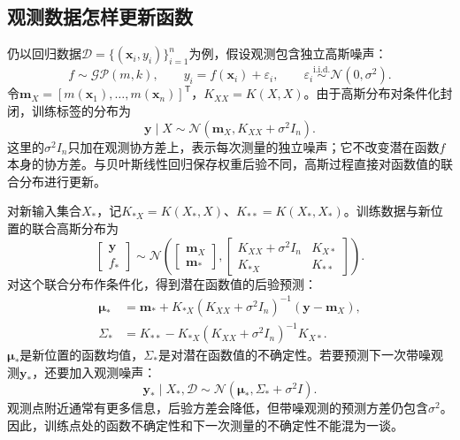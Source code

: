 \subsection{观测数据怎样更新函数}
仍以回归数据$\mathcal D=\{(\bm x_i,y_i)\}_{i=1}^n$为例，假设观测包含独立高斯噪声：
\begin{equation}
 f\sim\mathcal{GP}(m,k),
 \qquad y_i=f(\bm x_i)+\varepsilon_i,
 \qquad \varepsilon_i\overset{\mathrm{i.i.d.}}\sim\mathcal N(0,\sigma^2).
 \label{eq:gp-observation-model}
\end{equation}
令$\bm m_X=[m(\bm x_1),\ldots,m(\bm x_n)]^{\mathsf T}$，$K_{XX}=K(X,X)$。由于高斯分布对条件化封闭，训练标签的分布为
\begin{equation}
 \bm y\mid X\sim\mathcal N\left(\bm m_X,K_{XX}+\sigma^2I_n\right).
 \label{eq:gp-marginal-likelihood}
\end{equation}
这里的$\sigma^2I_n$只加在观测协方差上，表示每次测量的独立噪声；它不改变潜在函数$f$本身的协方差。与贝叶斯线性回归保存权重后验不同，高斯过程直接对函数值的联合分布进行更新。

对新输入集合$X_*$，记$K_{*X}=K(X_*,X)$、$K_{**}=K(X_*,X_*)$。训练数据与新位置的联合高斯分布为
\begin{equation}
 \begin{bmatrix}\bm y\\f_*\end{bmatrix}
 \sim\mathcal N\left(
 \begin{bmatrix}\bm m_X\\\bm m_*\end{bmatrix},
 \begin{bmatrix}
 K_{XX}+\sigma^2I_n&K_{X*}\\
 K_{*X}&K_{**}
 \end{bmatrix}\right).
 \label{eq:gp-joint}
\end{equation}
对这个联合分布作条件化，得到潜在函数值的后验预测：
\begin{align}
 \bm\mu_*&=\bm m_*+K_{*X}(K_{XX}+\sigma^2I_n)^{-1}(\bm y-\bm m_X),\\
 \Sigma_*&=K_{**}-K_{*X}(K_{XX}+\sigma^2I_n)^{-1}K_{X*}.
 \label{eq:gp-posterior}
\end{align}
$\bm\mu_*$是新位置的函数均值，$\Sigma_*$是对潜在函数值的不确定性。若要预测下一次带噪观测$\bm y_*$，还要加入观测噪声：
\begin{equation}
 \bm y_*\mid X_*,\mathcal D\sim\mathcal N(\bm\mu_*,\Sigma_*+\sigma^2I).
 \label{eq:gp-predictive}
\end{equation}
观测点附近通常有更多信息，后验方差会降低，但带噪观测的预测方差仍包含$\sigma^2$。因此，训练点处的函数不确定性和下一次测量的不确定性不能混为一谈。


